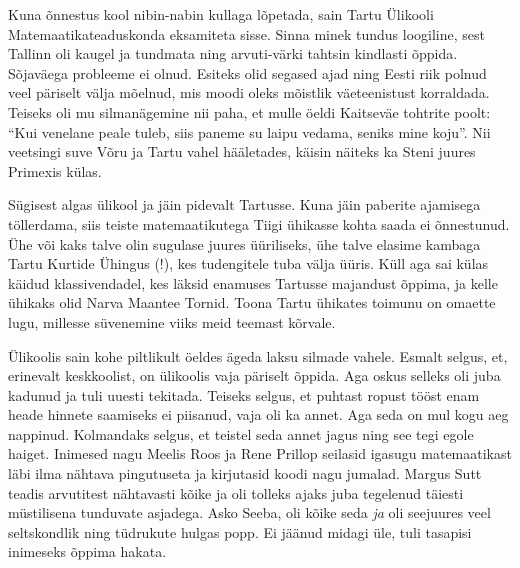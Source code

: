 Kuna õnnestus kool nibin-nabin kullaga lõpetada, sain Tartu Ülikooli 
Matemaatikateaduskonda eksamiteta 
sisse. Sinna minek tundus loogiline, sest Tallinn oli kaugel ja tundmata ning 
arvuti-värki tahtsin kindlasti õppida. Sõjaväega probleeme ei olnud. Esiteks 
olid segased ajad ning Eesti riik polnud veel päriselt välja mõelnud, mis moodi 
oleks mõistlik väeteenistust korraldada. Teiseks oli mu silmanägemine nii paha, 
et mulle öeldi Kaitseväe tohtrite poolt: \enquote{Kui venelane peale tuleb, 
siis paneme su laipu vedama, seniks mine koju}. Nii veetsingi suve Võru ja 
Tartu vahel hääletades, käisin näiteks ka Steni 
juures 
Primexis külas. 

Sügisest algas ülikool ja jäin pidevalt Tartusse. Kuna jäin paberite ajamisega 
töllerdama, siis teiste matemaatikutega Tiigi ühikasse kohta saada ei 
õnnestunud. Ühe või kaks talve olin sugulase juures üüriliseks, ühe talve 
elasime kambaga Tartu Kurtide Ühingus (!), kes 
tudengitele tuba välja üüris. Küll aga sai külas käidud klassivendadel, kes 
läksid enamuses Tartusse majandust õppima, ja kelle ühikaks olid Narva Maantee 
Tornid. Toona Tartu ühikates toimunu on omaette lugu, millesse süvenemine viiks 
meid teemast kõrvale.

Ülikoolis sain kohe piltlikult öeldes ägeda laksu silmade vahele. Esmalt 
selgus, et, erinevalt keskkoolist, on ülikoolis vaja päriselt õppida. Aga oskus 
selleks oli juba kadunud ja tuli uuesti tekitada. Teiseks selgus, et puhtast 
ropust tööst enam heade hinnete saamiseks ei piisanud, vaja oli ka annet. Aga 
seda on mul kogu aeg nappinud. Kolmandaks selgus, et teistel seda annet jagus 
ning see tegi egole haiget. Inimesed nagu Meelis Roos 
ja Rene Prillop seilasid igasugu matemaatikast läbi 
ilma nähtava pingutuseta ja kirjutasid koodi nagu jumalad. Margus 
Sutt teadis arvutitest nähtavasti kõike ja oli tolleks 
ajaks juba tegelenud täiesti müstilisena tunduvate asjadega. Asko 
Seeba, oli kõike seda \emph{ja} oli seejuures veel 
seltskondlik ning tüdrukute hulgas popp. Ei jäänud midagi üle, tuli tasapisi 
inimeseks õppima hakata. 

